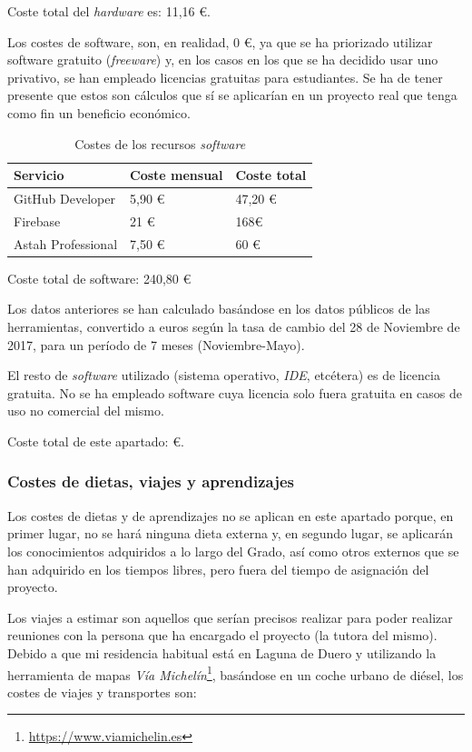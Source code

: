 \documentclass[twoside]{report}
\begin{document}
Coste total del \textit{hardware} es: 11,16 \euro.

Los costes de software, son, en realidad, 0 \euro, ya que se ha priorizado utilizar software gratuito (\textit{freeware}) y,  en los casos en los que se ha decidido usar uno privativo, se han empleado licencias gratuitas para estudiantes. Se ha de tener presente que estos son cálculos que sí se aplicarían en un proyecto real que tenga como fin un beneficio económico.

\begin{table}[H]
\centering
\begin{tabular}{|l|l|l|}
\hline
Servicio         & Coste mensual & Coste total \\ \hline
GitHub Developer & 5,90 \euro        & 47,20 \euro          \\ \hline
Firebase         & 21 \euro      & 168\euro           \\ \hline
Astah Professional & 7,50 \euro & 60 \euro \\ \hline
\end{tabular}
\caption{Costes de los recursos \textit{software}}
\end{table}

Coste total de software: 240,80 \euro

Los datos anteriores se han calculado basándose en los datos públicos de las herramientas, convertido a euros según la tasa de cambio del 28 de Noviembre de 2017, para un período de 7 meses (Noviembre-Mayo).

El resto de \textit{software} utilizado (sistema operativo, \textit{IDE}, etcétera) es de licencia gratuita. No se ha empleado software cuya licencia solo fuera gratuita en casos de uso no comercial del mismo.

Coste total de este apartado:  \euro .

\subsubsection{Costes de dietas, viajes y aprendizajes}

Los costes de dietas y de aprendizajes no se aplican en este apartado porque, en primer lugar, no se hará ninguna dieta externa y, en segundo lugar, se aplicarán los conocimientos adquiridos a lo largo del Grado, así como otros externos que se han adquirido en los tiempos libres, pero fuera del tiempo de asignación del proyecto.

Los viajes a estimar son aquellos que serían precisos realizar para poder realizar reuniones con la persona que ha encargado el proyecto (la tutora del mismo). Debido a que mi residencia habitual está en Laguna de Duero y utilizando la herramienta de mapas \textit{Vía Michelín}\footnote{\url{https://www.viamichelin.es}}, basándose en un coche urbano de diésel, los costes de viajes y transportes son:
\end{document}

